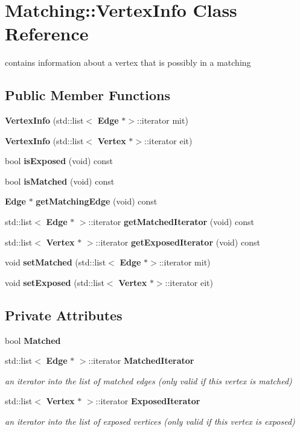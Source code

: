 \section{Matching\+:\+:Vertex\+Info Class Reference}
\label{classMatching_1_1VertexInfo}


contains information about a vertex that is possibly in a matching  


\subsection*{Public Member Functions}
\begin{DoxyCompactItemize}
\item 
\textbf{ Vertex\+Info} (std\+::list$<$ \textbf{ Edge} $\ast$$>$\+::iterator mit)
\item 
\textbf{ Vertex\+Info} (std\+::list$<$ \textbf{ Vertex} $\ast$$>$\+::iterator eit)
\item 
bool \textbf{ is\+Exposed} (void) const
\item 
bool \textbf{ is\+Matched} (void) const
\item 
\textbf{ Edge} $\ast$ \textbf{ get\+Matching\+Edge} (void) const
\item 
std\+::list$<$ \textbf{ Edge} $\ast$ $>$\+::iterator \textbf{ get\+Matched\+Iterator} (void) const
\item 
std\+::list$<$ \textbf{ Vertex} $\ast$ $>$\+::iterator \textbf{ get\+Exposed\+Iterator} (void) const
\item 
void \textbf{ set\+Matched} (std\+::list$<$ \textbf{ Edge} $\ast$$>$\+::iterator mit)
\item 
void \textbf{ set\+Exposed} (std\+::list$<$ \textbf{ Vertex} $\ast$$>$\+::iterator eit)
\end{DoxyCompactItemize}
\subsection*{Private Attributes}
\begin{DoxyCompactItemize}
\item 
bool \textbf{ Matched}
\item 
std\+::list$<$ \textbf{ Edge} $\ast$ $>$\+::iterator \textbf{ Matched\+Iterator}
\begin{DoxyCompactList}\small\item\em an iterator into the list of matched edges (only valid if this vertex is matched) \end{DoxyCompactList}\item 
std\+::list$<$ \textbf{ Vertex} $\ast$ $>$\+::iterator \textbf{ Exposed\+Iterator}
\begin{DoxyCompactList}\small\item\em an iterator into the list of exposed vertices (only valid if this vertex is exposed) \end{DoxyCompactList}\end{DoxyCompactItemize}



